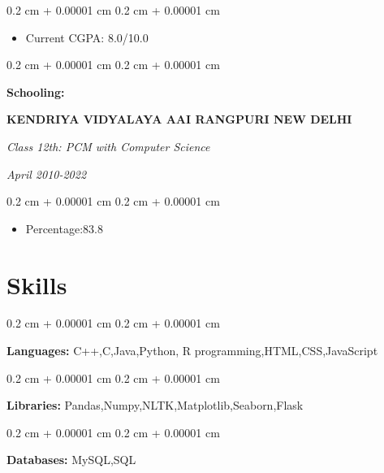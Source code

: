 \documentclass[10pt, letterpaper]{article}
\newenvironment{highlights}{
    \begin{itemize}[
        topsep=0.10 cm,
        parsep=0.10 cm,
        partopsep=0pt,
        itemsep=0pt,
        leftmargin=0.4 cm + 10pt
    ]
}{
    \end{itemize}
} %
\newenvironment{onecolentry}{
    \begin{adjustwidth}{
        0.2 cm + 0.00001 cm
    }{
        0.2 cm + 0.00001 cm
    }
}{
    \end{adjustwidth}
} %
\newenvironment{twocolentry}[2][]{
    \onecolentry
    \def\secondColumn{#2}
    \setcolumnwidth{\fill, 4.5 cm}
    \begin{paracol}{2}
}{
    \switchcolumn \raggedleft \secondColumn
    \end{paracol}
    \endonecolentry
} %
\begin{document}
        \vspace{0.10 cm}
        \begin{onecolentry}
            \begin{highlights}
                \item Current CGPA: 8.0/10.0
                
            \end{highlights}
        \end{onecolentry}

        \begin{twocolentry}{
        \textit{April 2010-2022} }
              \textbf{Schooling:}
        
        \textbf{KENDRIYA VIDYALAYA AAI RANGPURI NEW DELHI}
        
        \textit{Class 12th: PCM with Computer Science}
         \end{twocolentry}
        
        \vspace{0.10 cm}
        \begin{onecolentry}
            \begin{highlights}
                \item Percentage:83.8%
            \end{highlights}
        \end{onecolentry}

    \section{Skills}
          \begin{onecolentry}
            \textbf{Languages:} C++,C,Java,Python, R programming,HTML,CSS,JavaScript
        \end{onecolentry}

        \vspace{0.2 cm}
           \begin{onecolentry}
            \textbf{Libraries:} Pandas,Numpy,NLTK,Matplotlib,Seaborn,Flask
        \end{onecolentry}

        \vspace{0.2 cm}
         \begin{onecolentry}
            \textbf{Databases:} MySQL,SQL
        \end{onecolentry}

        \vspace{0.2 cm}
        
\end{document}
